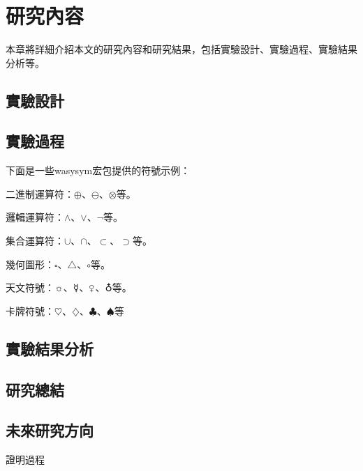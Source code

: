 \documentclass[writingLanguage=chinese,
    addPageTitle=on,
    addDeclaration=on,
    addMUSTlog=off,
    addFigTOC=on,   
    addTabTOC=on,
    refIndent=on,
    printMod=off,
]{.def/must}
\begin{document}
\txtHere{[1]}

\section{研究內容}

本章將詳細介紹本文的研究內容和研究結果，包括實驗設計、實驗過程、實驗結果分析等。

\subsection{實驗設計}

\txtHere{[1]}

\subsection{實驗過程}
下面是一些wasysym宏包提供的符號示例：

二進制運算符：$\oplus$、$\ominus$、$\otimes$等。

邏輯運算符：$\wedge$、$\vee$、$\neg$等。

集合運算符：$\cup$、$\cap$、$\subset$、$\supset$等。

幾何圖形：$\square$、$\triangle$、$\circ$等。

天文符號：$\sun$、$\mercury$、$\venus$、$\earth$等。

卡牌符號：$\heartsuit$、$\diamondsuit$、$\clubsuit$、$\spadesuit$等

\subsection{實驗結果分析}

\txtHere{[1]}


 
\subsection{研究總結}

\txtHere{[1]}

\subsection{未來研究方向}

\txtHere{[1]}



\addreference


\begin{appendix}
證明過程
\end{appendix}
\end{document}
